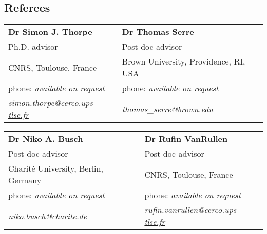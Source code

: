 \documentclass[margin,line]{resume}
\begin{document}
\begin{resume}
	\section{\mysidestyle Referees} 

	\begin{tabular}{@{}p{6cm}p{6cm}}
	\textbf{Dr Simon J. Thorpe}       &  \textbf{Dr Thomas Serre}                   \\
	Ph.D. advisor                               &  Post-doc advisor                       \\
	CNRS, Toulouse, France          &  Brown University, Providence, RI, USA        \\
	phone: \textsl{available on request}    &  phone: \textsl{available on request}     \\
	\textsl{\href{mailto:simon.thorpe@cerco.ups-tlse.fr}{simon.thorpe@cerco.ups-tlse.fr}}   &  
	\textsl{\href{mailto:thomas_serre@brown.edu}{thomas\_serre@brown.edu}}    \\
	\end{tabular}
	
	\begin{tabular}{@{}p{6cm}p{6cm}}
	\textbf{Dr Niko A. Busch}       &  \textbf{Dr Rufin VanRullen}                   \\
	Post-doc advisor                   &  Post-doc advisor                       \\
	Charité University, Berlin, Germany         &  CNRS, Toulouse, France        \\
	phone: \textsl{available on request}    &  phone: \textsl{available on request}     \\
	\textsl{\href{mailto:niko.busch@charite.de}{niko.busch@charite.de}}  &  
	\textsl{\href{mailto:rufin.vanrullen@cerco.ups-tlse.fr}{rufin.vanrullen@cerco.ups-tlse.fr}}    \\
	\end{tabular}


\end{resume}
\end{document}
